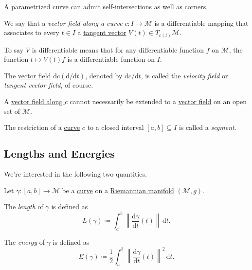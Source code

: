 \begin{note}
	A parametrized curve can admit self-intersections as well as corners.
	\begin{center}
	\end{center}
\end{note}

\begin{definition}\label{def:vector-field-curve}
	We say that a \emph{vector field along a curve} \(c\colon I \to \mathcal{M} \) is a differentiable mapping that associates to every \(t\in I\) a \hyperref[def:tangent-vector]{tangent vector} \(V(t)\in T_{c(t)}\mathcal{M} \).
\end{definition}

To say \(V\) is differentiable means that for any differentiable function \(f\) on \(\mathcal{M} \), the function \(t \mapsto V(t) f\) is a differentiable function on \(I\).

\begin{eg}
	The \hyperref[def:vector-field-curve]{vector field} \(\mathrm{d} c (\mathrm{d} / \mathrm{d} t)\), denoted by \(\mathrm{d} c / \mathrm{d} t\), is called the \emph{velocity field} or \emph{tangent vector field}, of course.
\end{eg}

\begin{remark}
	A \hyperref[def:vector-field-curve]{vector field along \(c\)} cannot necessarily be extended to a \hyperref[def:vector-field]{vector field} on an open set of \(\mathcal{M} \).
\end{remark}

\begin{notation}[Segment]
	The restriction of a \hyperref[def:curve]{curve} \(c\) to a closed interval \([a, b] \subseteq I\) is called a \emph{segment}.
\end{notation}

\subsection{Lengths and Energies}
We're interested in the following two quantities.

\begin{definition*}
	Let \(\gamma \colon [a, b] \to  \mathcal{M} \) be a \hyperref[def:curve]{curve} on a \hyperref[def:Riemannian-manifold]{Riemannian manifold} \((\mathcal{M} , g)\).

	\begin{definition}[Length]\label{def:length}
		The \emph{length} of \(\gamma \) is defined as
		\[
			L(\gamma ) \coloneqq \int_{a}^{b} \left\lVert \frac{\mathrm{d}\gamma }{\mathrm{d}t} (t) \right\rVert  \,\mathrm{d}t .
		\]
	\end{definition}

	\begin{definition}[Energy]\label{def:energy}
		The \emph{energy} of \(\gamma \) is defined as
		\[
			E(\gamma )\coloneqq \frac{1}{2} \int_{a}^{b} \left\lVert \frac{\mathrm{d}\gamma }{\mathrm{d}t} (t) \right\rVert ^2 \,\mathrm{d}t .
		\]
	\end{definition}
\end{definition*}

